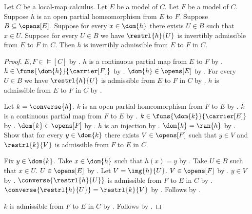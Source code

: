 \begin{theorem}\label{invertibly_admissible_locality}
    Let $C$ be a local-map calculus.
    Let $E$ be a model of $C$.
    Let $F$ be a model of $C$.
    Suppose $h$ is an open partial homeomorphism from $E$ to $F$.
    Suppose $B\subseteq\opens[E]$.
    Suppose for every $x\in\dom{h}$ there exists $U\in B$ such that $x\in U$.
    Suppose for every $U\in B$ we have
        $\restrl{h}{U}$ is invertibly admissible from $E$ to $F$ in $C$.
    Then $h$ is invertibly admissible from $E$ to $F$ in $C$.
\end{theorem}
\begin{proof}
    $E,F\in\models[C]$ by .
    $h$ is a continuous partial map from $E$ to $F$ by
        .
    $h\in\funs{\dom{h}}{\carrier[F]}$ by .
    $\dom{h}\in\opens[E]$ by .
    For every $U\in B$ we have $\restrl{h}{U}$ is admissible from $E$ to $F$ in $C$
        by .
    $h$ is admissible from $E$ to $F$ in $C$ by .

    Let $k=\converse{h}$.
    $k$ is an open partial homeomorphism from $F$ to $E$ by
        .
    $k$ is a continuous partial map from $F$ to $E$ by
        .
    $k\in\funs{\dom{k}}{\carrier[E]}$ by .
    $\dom{k}\in\opens[F]$ by .
    $h$ is an injection by
        .
    $\dom{k}=\ran{h}$ by .
    Show that for every $y\in\dom{k}$ there exists $V\in\opens[F]$ such that
        $y\in V$ and $\restrl{k}{V}$ is admissible from $F$ to $E$ in $C$.
    \begin{subproof}
        Fix $y\in\dom{k}$.
        Take $x\in\dom{h}$ such that $h(x)=y$ by .
        Take $U\in B$ such that $x\in U$.
        $U\in\opens[E]$ by .
        Let $V=\img{h}{U}$.
        $V\in\opens[F]$ by .
        $y\in V$ by .
        $\converse{\restrl{h}{U}}$ is admissible from $F$ to $E$ in $C$ by
            .
        $\converse{\restrl{h}{U}}=\restrl{k}{V}$ by .
        Follows by \auto.
    \end{subproof}
    $k$ is admissible from $F$ to $E$ in $C$ by .
    Follows by .
\end{proof}

